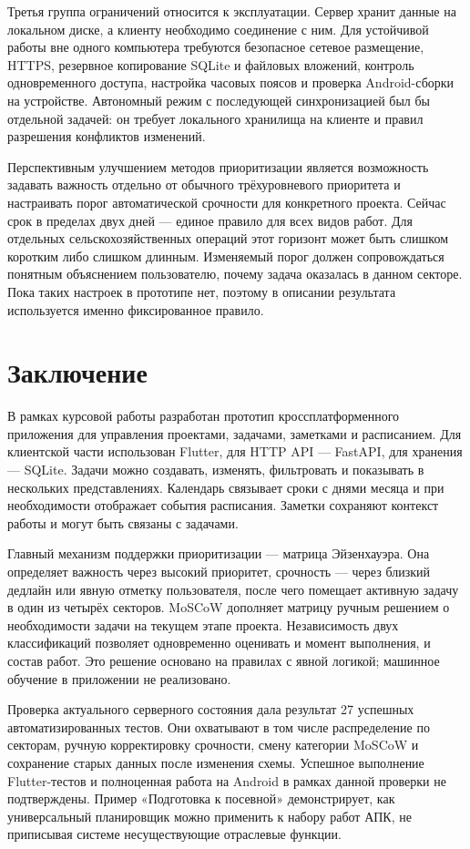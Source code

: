 \documentclass[14pt,a4paper]{extarticle}
\begin{document}
Третья группа ограничений относится к эксплуатации. Сервер хранит данные на локальном диске, а клиенту необходимо соединение с ним. Для устойчивой работы вне одного компьютера требуются безопасное сетевое размещение, HTTPS, резервное копирование SQLite и файловых вложений, контроль одновременного доступа, настройка часовых поясов и проверка Android-сборки на устройстве. Автономный режим с последующей синхронизацией был бы отдельной задачей: он требует локального хранилища на клиенте и правил разрешения конфликтов изменений.

Перспективным улучшением методов приоритизации является возможность задавать важность отдельно от обычного трёхуровневого приоритета и настраивать порог автоматической срочности для конкретного проекта. Сейчас срок в пределах двух дней --- единое правило для всех видов работ. Для отдельных сельскохозяйственных операций этот горизонт может быть слишком коротким либо слишком длинным. Изменяемый порог должен сопровождаться понятным объяснением пользователю, почему задача оказалась в данном секторе. Пока таких настроек в прототипе нет, поэтому в описании результата используется именно фиксированное правило.

\section*{Заключение}

В рамках курсовой работы разработан прототип кроссплатформенного приложения для управления проектами, задачами, заметками и расписанием. Для клиентской части использован Flutter, для HTTP API --- FastAPI, для хранения --- SQLite. Задачи можно создавать, изменять, фильтровать и показывать в нескольких представлениях. Календарь связывает сроки с днями месяца и при необходимости отображает события расписания. Заметки сохраняют контекст работы и могут быть связаны с задачами.

Главный механизм поддержки приоритизации --- матрица Эйзенхауэра. Она определяет важность через высокий приоритет, срочность --- через близкий дедлайн или явную отметку пользователя, после чего помещает активную задачу в один из четырёх секторов. MoSCoW дополняет матрицу ручным решением о необходимости задачи на текущем этапе проекта. Независимость двух классификаций позволяет одновременно оценивать и момент выполнения, и состав работ. Это решение основано на правилах с явной логикой; машинное обучение в приложении не реализовано.

Проверка актуального серверного состояния дала результат 27 успешных автоматизированных тестов. Они охватывают в том числе распределение по секторам, ручную корректировку срочности, смену категории MoSCoW и сохранение старых данных после изменения схемы. Успешное выполнение Flutter-тестов и полноценная работа на Android в рамках данной проверки не подтверждены. Пример «Подготовка к посевной» демонстрирует, как универсальный планировщик можно применить к набору работ АПК, не приписывая системе несуществующие отраслевые функции.
\end{document}
